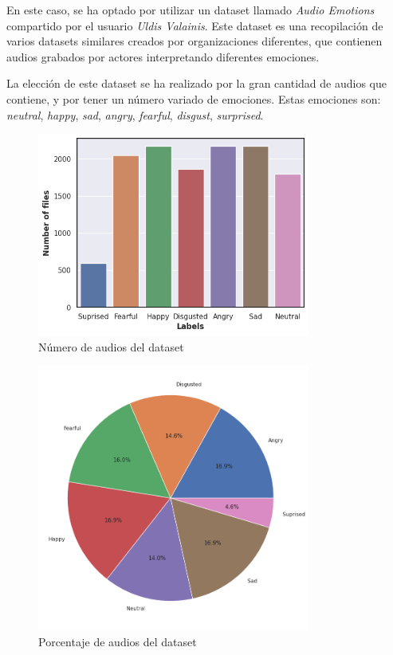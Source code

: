 En este caso, se ha optado por utilizar un dataset llamado \textit{Audio Emotions} compartido por el usuario \textit{Uldis Valainis}. \cite{Kaggle-dataset}
Este dataset es una recopilación de varios datasets similares creados por organizaciones diferentes, que contienen audios grabados por actores interpretando diferentes emociones.

La elección de este dataset se ha realizado por la gran cantidad de audios que contiene, y por tener un número variado de emociones.
Estas emociones son: \textit{neutral}, \textit{happy}, \textit{sad}, \textit{angry}, \textit{fearful}, \textit{disgust}, \textit{surprised}.


\begin{figure}[H]
    \centering
    \includegraphics[width=0.8\textwidth]{cap2/images/dataset-bars.png}
    \caption{Número de audios del dataset}
    \label{fig:data-bars}
\end{figure}

\begin{figure}[H]
    \centering
    \includegraphics[width=0.8\textwidth]{cap2/images/dataset-pie.png}
    \caption{Porcentaje de audios del dataset}
    \label{fig:data-pie}
\end{figure}


